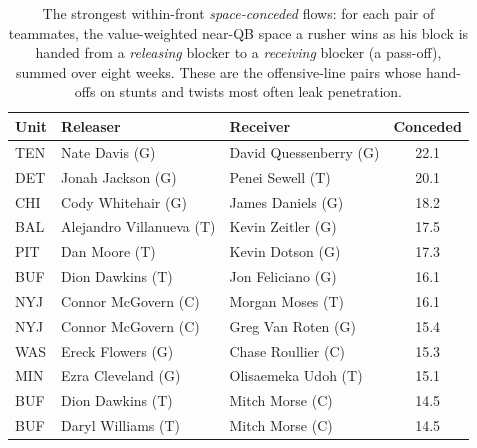 \begin{table}[h!]
\centering
\footnotesize
\begin{tabular}{lllc}
\toprule
Unit & Releaser & Receiver & Conceded \\
\midrule
TEN & Nate Davis (G) & David Quessenberry (G) & 22.1 \\
DET & Jonah Jackson (G) & Penei Sewell (T) & 20.1 \\
CHI & Cody Whitehair (G) & James Daniels (G) & 18.2 \\
BAL & Alejandro Villanueva (T) & Kevin Zeitler (G) & 17.5 \\
PIT & Dan Moore (T) & Kevin Dotson (G) & 17.3 \\
BUF & Dion Dawkins (T) & Jon Feliciano (G) & 16.1 \\
NYJ & Connor McGovern (C) & Morgan Moses (T) & 16.1 \\
NYJ & Connor McGovern (C) & Greg Van Roten (G) & 15.4 \\
WAS & Ereck Flowers (G) & Chase Roullier (C) & 15.3 \\
MIN & Ezra Cleveland (G) & Olisaemeka Udoh (T) & 15.1 \\
BUF & Dion Dawkins (T) & Mitch Morse (C) & 14.5 \\
BUF & Daryl Williams (T) & Mitch Morse (C) & 14.5 \\
\bottomrule
\end{tabular}
\caption{The strongest within-front \emph{space-conceded} flows: for each pair of teammates, the value-weighted near-QB space a rusher wins as his block is handed from a \emph{releasing} blocker to a \emph{receiving} blocker (a pass-off), summed over eight weeks. These are the offensive-line pairs whose hand-offs on stunts and twists most often leak penetration.}
\label{tab:pocket_concede_flow}
\end{table}
